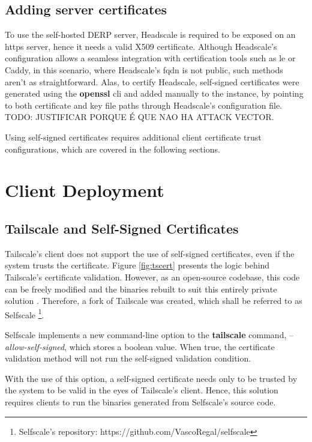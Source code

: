 \documentclass[11pt,twoside,a4paper]{report}
\begin{document}
\subsection{Adding server certificates}

To use the self-hosted \ac{DERP} server, Headscale is required to be exposed on an \ac{https} server, hence it needs a valid X509 certificate. Although Headscale's configuration allows a seamless integration with certification tools such as \ac{le} or Caddy, in this scenario, where Headscale's \ac{fqdn} is not public, such methods aren't as straightforward. Alas, to certify Headscale, self-signed certificates were generated using the \textbf{openssl} \ac{cli} and added manually to the instance, by pointing to both certificate and key file paths through Headscale's configuration file. TODO: JUSTIFICAR PORQUE É QUE NAO HA ATTACK VECTOR.

Using self-signed certificates requires additional client certificate trust configurations, which are covered in the following sections.

\section{Client Deployment}


\iffalse
\subsection{Tailscale and Self-Signed Certificates}
\label{sec:selfscale}

Tailscale's client does not support the use of self-signed certificates, even if the system trusts the certificate. Figure \ref{fig:tscert} presents the logic behind Tailscale's certificate validation. However, as an open-source codebase, this code can be freely modified and the binaries rebuilt to suit this entirely private solution . Therefore, a fork of Tailscale was created, which shall be referred to as Selfscale \footnote{Selfscale's repository: https://github.com/VascoRegal/selfscale}.

Selfscale implements a new command-line option to the \textbf{tailscale} command, --\emph{allow-self-signed}, which stores a boolean value. When true, the certificate validation method will not run the self-signed validation condition.

With the use of this option, a self-signed certificate needs only to be trusted by the system to be valid in the eyes of Tailscale's client. Hence, this solution requires clients to run the binaries generated from Selfscale's source code.
\end{document}

